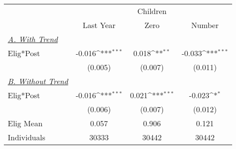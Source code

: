 {
\def\sym#1{\ifmmode^{#1}\else\(^{#1}\)\fi}
\begin{tabular}{l*{3}{c}}
\hline\hline
            &\multicolumn{3}{c}{Children}                                     \\\cmidrule(lr){2-4}
            &\multicolumn{1}{c}{Last Year}&\multicolumn{1}{c}{Zero}&\multicolumn{1}{c}{Number}\\
\hline
\midrule \it{\underline{A. With Trend}} \\ Elig*Post   &      -0.016\sym{***}&       0.018\sym{**} &      -0.033\sym{***}\\
            &     (0.005)         &     (0.007)         &     (0.011)         \\
\hline



\midrule \it{\underline{B. Without Trend}} \\ Elig*Post   &      -0.016\sym{***}&       0.021\sym{***}&      -0.023\sym{*}  \\
            &     (0.006)         &     (0.007)         &     (0.012)         \\
\hline
Elig Mean   &       0.057         &       0.906         &       0.121         \\
Individuals &       30333         &       30442         &       30442         \\
\hline\hline
\end{tabular}
}

